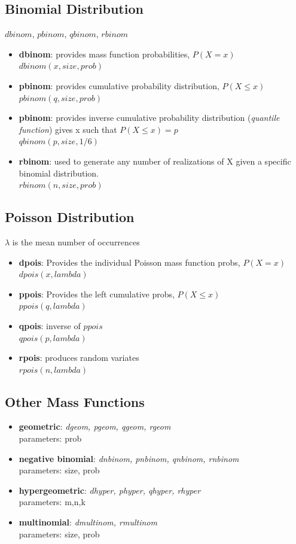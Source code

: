 \documentclass[openany]{book}
\begin{document}
\begin{flushleft}
\subsection{Binomial Distribution}
$dbinom$, $pbinom$, $qbinom$, $rbinom$ \medbreak
\begin{itemize}
\item \textbf{dbinom}: provides mass function probabilities, $P(X=x)$\\
$dbinom(x,size,prob)$
\item \textbf{pbinom}: provides cumulative probability distribution, $P(X\leq x)$\\
$pbinom(q,size,prob)$
\item \textbf{pbinom}: provides inverse cumulative probability distribution (\textit{quantile function}) gives x such that $P(X\leq x)=p$\\
$qbinom(p,size,1/6)$
\item \textbf{rbinom}: used to generate any number of realizations of X given a specific binomial distribution.\\
$rbinom(n,size,prob)$
\end{itemize}
\subsection{Poisson Distribution}
$\lambda$ is the mean number of occurrences
\begin{itemize}
\item \textbf{dpois}: Provides the individual Poisson mass function probs, $P(X=x)$\\
$dpois(x,lambda)$
\item \textbf{ppois}: Provides the left cumulative probs, $P(X\leq x)$\\
$ppois(q,lambda)$
\item \textbf{qpois}: inverse of $ppois$\\
$qpois(p,lambda)$
\item \textbf{rpois}: produces random variates\\
$rpois(n,lambda)$
\end{itemize}
\subsection{Other Mass Functions}
\begin{itemize}
\item \textbf{geometric}: \textit{dgeom, pgeom, qgeom, rgeom}\\
parameters: prob
\item \textbf{negative binomial}: \textit{dnbinom, pnbinom, qnbinom, rnbinom}\\
parameters: size, prob
\item \textbf{hypergeometric}: \textit{dhyper, phyper, qhyper, rhyper}\\
parameters: m,n,k
\item \textbf{multinomial}: \textit{dmultinom, rmultinom}\\
parameters: size, prob
\end{itemize}

\end{flushleft}
\end{document}
